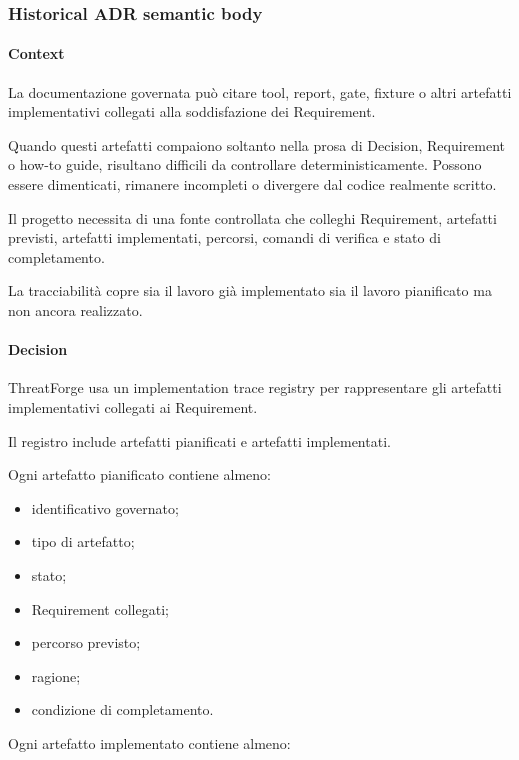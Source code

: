 \documentclass[
  10pt,
]{article}
\providecommand{\tightlist}{%
  \setlength{\itemsep}{0pt}\setlength{\parskip}{0pt}}
\begin{document}
\subsubsection{Historical ADR semantic
body}\label{historical-adr-semantic-body-2}

\paragraph{Context}\label{context-4}

La documentazione governata può citare tool, report, gate, fixture o
altri artefatti implementativi collegati alla soddisfazione dei
Requirement.

Quando questi artefatti compaiono soltanto nella prosa di Decision,
Requirement o how-to guide, risultano difficili da controllare
deterministicamente. Possono essere dimenticati, rimanere incompleti o
divergere dal codice realmente scritto.

Il progetto necessita di una fonte controllata che colleghi Requirement,
artefatti previsti, artefatti implementati, percorsi, comandi di
verifica e stato di completamento.

La tracciabilità copre sia il lavoro già implementato sia il lavoro
pianificato ma non ancora realizzato.

\paragraph{Decision}\label{decision-4}

ThreatForge usa un implementation trace registry per rappresentare gli
artefatti implementativi collegati ai Requirement.

Il registro include artefatti pianificati e artefatti implementati.

Ogni artefatto pianificato contiene almeno:

\begin{itemize}
\tightlist
\item
  identificativo governato;
\item
  tipo di artefatto;
\item
  stato;
\item
  Requirement collegati;
\item
  percorso previsto;
\item
  ragione;
\item
  condizione di completamento.
\end{itemize}

Ogni artefatto implementato contiene almeno:
\end{document}
